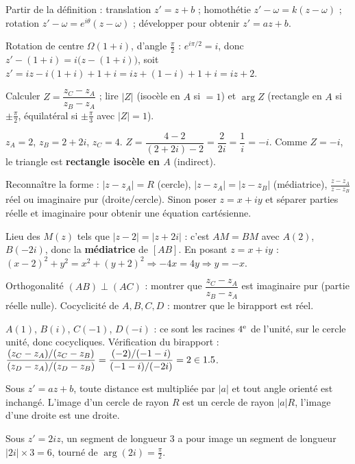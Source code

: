 Partir de la définition : translation $z'=z+b$ ; homothétie $z'-\omega=k(z-\omega)$ ;
rotation $z'-\omega=e^{i\theta}(z-\omega)$ ; développer pour obtenir $z'=az+b$.
\begin{exemple}
Rotation de centre $\Omega(1+i)$, d'angle $\frac\pi2$ : $e^{i\pi/2}=i$, donc
$z'-(1+i)=i\big(z-(1+i)\big)$, soit $z'=iz -i(1+i)+1+i=iz +(1-i)+1+i=iz+2$.
\end{exemple}

Calculer $Z=\dfrac{z_C-z_A}{z_B-z_A}$ ; lire $|Z|$ (isocèle en $A$ si $=1$) et $\arg Z$ (rectangle en
$A$ si $\pm\frac\pi2$, équilatéral si $\pm\frac\pi3$ avec $|Z|=1$).
\begin{exemple}
$z_A=2$, $z_B=2+2i$, $z_C=4$. $Z=\dfrac{4-2}{(2+2i)-2}=\dfrac{2}{2i}=\dfrac1i=-i$. Comme $Z=-i$,
le triangle est \textbf{rectangle isocèle en $A$} (indirect).
\end{exemple}

Reconnaître la forme : $|z-z_A|=R$ (cercle), $|z-z_A|=|z-z_B|$ (médiatrice), $\frac{z-z_A}{z-z_B}$
réel ou imaginaire pur (droite/cercle). Sinon poser $z=x+iy$ et séparer parties réelle et
imaginaire pour obtenir une équation cartésienne.
\begin{exemple}
Lieu des $M(z)$ tels que $|z-2|=|z+2i|$ : c'est $AM=BM$ avec $A(2)$, $B(-2i)$, donc la
\textbf{médiatrice} de $[AB]$. En posant $z=x+iy$ : $(x-2)^2+y^2=x^2+(y+2)^2\Rightarrow -4x= 4y\Rightarrow y=-x$.
\end{exemple}

Orthogonalité $(AB)\perp(AC)$ : montrer que $\dfrac{z_C-z_A}{z_B-z_A}$ est imaginaire pur (partie
réelle nulle). Cocyclicité de $A,B,C,D$ : montrer que le birapport est réel.
\begin{exemple}
$A(1)$, $B(i)$, $C(-1)$, $D(-i)$ : ce sont les racines $4^{\text e}$ de l'unité, sur le cercle
unité, donc cocycliques. Vérification du birapport :
$\dfrac{(z_C-z_A)/(z_C-z_B)}{(z_D-z_A)/(z_D-z_B)}=\dfrac{(-2)/(-1-i)}{(-1-i)/(-2i)}=2\in1.5$.
\end{exemple}

Sous $z'=az+b$, toute distance est multipliée par $|a|$ et tout angle orienté est inchangé.
L'image d'un cercle de rayon $R$ est un cercle de rayon $|a|R$, l'image d'une droite est une droite.
\begin{exemple}
Sous $z'=2iz$, un segment de longueur $3$ a pour image un segment de longueur $|2i|\times3=6$,
tourné de $\arg(2i)=\frac\pi2$.
\end{exemple}

